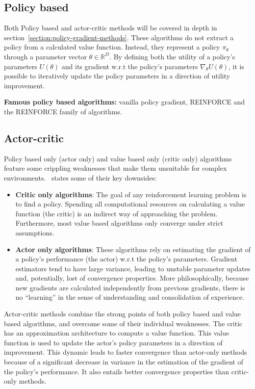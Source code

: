\documentclass{../main.tex}{}
\begin{document}
\subsection{Policy based}
Both Policy based and actor-critic methods will be covered in depth in section~\ref{section:policy-gradient-methods}. These algorithms do not extract a policy from a calculated value function. Instead, they represent a policy $\pi_{\theta}$ through a parameter vector $\theta \in \mathbb{R}^D$. By defining both the utility of a policy's parameters $U(\theta)$ and its gradient w.r.t the policy's parameters $\nabla_{\theta}U(\theta)$, it is possible to iteratively update the policy parameters in a direction of utility improvement. 

\textbf{Famous policy based algorithms:} vanilla policy gradient, REINFORCE\citep{Williams1992} and the REINFORCE family of algorithms\@.

\subsection{Actor-critic}

Policy based only (actor only) and value based only (critic only) algorithms feature some crippling weaknesses that make them unsuitable for complex environments.~\citep{Konda2000} states some of their key downsides:
\begin{itemize}
\item \textbf{Critic only algorithms}: The goal of any reinforcement learning problem is to find a policy. Spending all computational resources on calculating a value function (the critic) is an indirect way of approaching the problem. Furthermore, most value based algorithms only converge under strict assumptions.
\item \textbf{Actor only algorithms}: These algorithms rely on estimating the gradient of a policy's performance (the actor) w.r.t the policy's parameters. Gradient estimators tend to have large variance, leading to unstable parameter updates and, potentially, lost of convergence properties. More philosophically, because new gradients are calculated independently from previous gradients, there is no ``learning'' in the sense of understanding and consolidation of experience.
\end{itemize}

Actor-critic methods combine the strong points of both policy based and value based algorithms, and overcome some of their individual weaknesses. The critic has an approximation architecture to compute a value function. This value function is used to update the actor's policy parameters in a direction of improvement. This dynamic leads to faster convergence than actor-only methods because of a significant decrease in variance in the estimation of the gradient of the policy's performance. It also entails better convergence properties than critic-only methods. 
\end{document}
